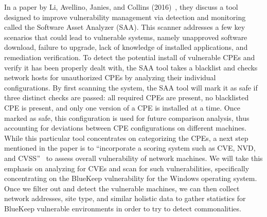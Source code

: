 In a paper by Li, Avellino, Janies, and Collins (2016)~\cite{li_avellino_janies_collins_2016}, they discuss a tool designed to improve vulnerability management via detection and monitoring called the Software Asset Analyzer (SAA). This scanner addresses a few key scenarios that could lead to vulnerable systems, namely unapproved software download, failure to upgrade, lack of knowledge of installed applications, and remediation verification. To detect the potential install of vulnerable CPEs and verify it has been properly dealt with, the SAA tool takes a blacklist and checks network hosts for unauthorized CPEs by analyzing their individual configurations. By first scanning the system, the SAA tool will mark it as safe if three distinct checks are passed: all required CPEs are present, no blacklisted CPE is present, and only one version of a CPE is installed at a time. Once marked as safe, this configuration is used for future comparison analysis, thus accounting for deviations between CPE configurations on different machines. While this particular tool concentrates on categorizing the CPEs, a next step mentioned in the paper is to ``incorporate a scoring system such as CVE, NVD, and CVSS''~\cite{li_avellino_janies_collins_2016} to assess overall vulnerability of network machines. We will take this emphasis on analyzing for CVEs and scan for such vulnerabilities, specifically concentrating on the BlueKeep vulnerability for the Windows operating system. Once we filter out and detect the vulnerable machines, we can then collect network addresses, site type, and similar holistic data to gather statistics for BlueKeep vulnerable environments in order to try to detect commonalities.